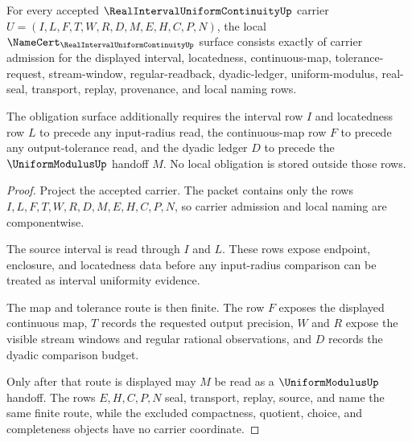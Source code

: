 \begin{theorem}
\label{thm:real-interval-uniform-continuity-namecert-obligations}
For every accepted $\RealIntervalUniformContinuityUp$ carrier $U=(I,L,F,T,W,R,D,M,E,H,C,P,N)$, the local $\NameCert_{\RealIntervalUniformContinuityUp}$ surface consists exactly of carrier admission for the displayed interval, locatedness, continuous-map, tolerance-request, stream-window, regular-readback, dyadic-ledger, uniform-modulus, real-seal, transport, replay, provenance, and local naming rows.

The obligation surface additionally requires the interval row $I$ and locatedness row $L$ to precede any input-radius read, the continuous-map row $F$ to precede any output-tolerance read, and the dyadic ledger $D$ to precede the $\UniformModulusUp$ handoff $M$. No local obligation is stored outside those rows.
\end{theorem}
\begin{proof}
Project the accepted carrier. The packet contains only the rows $I,L,F,T,W,R,D,M,E,H,C,P,N$, so carrier admission and local naming are componentwise.

The source interval is read through $I$ and $L$. These rows expose endpoint, enclosure, and locatedness data before any input-radius comparison can be treated as interval uniformity evidence.

The map and tolerance route is then finite. The row $F$ exposes the displayed continuous map, $T$ records the requested output precision, $W$ and $R$ expose the visible stream windows and regular rational observations, and $D$ records the dyadic comparison budget.

Only after that route is displayed may $M$ be read as a $\UniformModulusUp$ handoff. The rows $E,H,C,P,N$ seal, transport, replay, source, and name the same finite route, while the excluded compactness, quotient, choice, and completeness objects have no carrier coordinate.
\end{proof}

